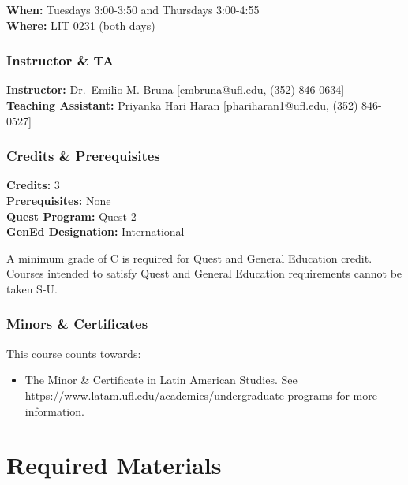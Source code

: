 \documentclass[
  10pt,
  letterpaper,
  oneside,
  open=any]{scrbook}
\providecommand{\tightlist}{%
  \setlength{\itemsep}{0pt}\setlength{\parskip}{0pt}}
\begin{document}
\textbf{When:} Tuesdays 3:00-3:50 and Thursdays 3:00-4:55\\
\textbf{Where:} LIT 0231 (both days)

\subsection*{Instructor \& TA}\label{instructor-ta}

\textbf{Instructor:} Dr.~Emilio M. Bruna {[}embruna@ufl.edu, (352)
846-0634{]}\\
\textbf{Teaching Assistant:} Priyanka Hari Haran {[}phariharan1@ufl.edu,
(352) 846-0527{]}

\subsection*{Credits \& Prerequisites}\label{credits-prerequisites}

\textbf{Credits:} 3\\
\textbf{Prerequisites:} None\\
\textbf{Quest Program:} Quest 2 \\
\textbf{GenEd Designation:} International

A minimum grade of C is required for Quest and General Education credit.
Courses intended to satisfy Quest and General Education requirements
cannot be taken S-U.

\subsection*{Minors \& Certificates}\label{minors-certificates}

This course counts towards:

\begin{itemize}
\tightlist
\item
  The Minor \& Certificate in Latin American Studies. See
  \url{https://www.latam.ufl.edu/academics/undergraduate-programs} for
  more information.
\end{itemize}


\chapter{Required Materials}\label{required-materials}
\end{document}

